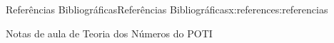 \documentclass[oneside,10pt,]{book}
\numberwithin{equation}{section}
\begin{document}
%
%
\typeout{************************************************}
\typeout{************************************************}
%
\begin{references-}{Referências Bibliográficas}{}{Referências Bibliográficas}{}{}{x:references:referencias}
\begin{referencelist}
\hypertarget{x:biblio:poti-tn-01}{}  Notas de aula de Teoria dos Números do POTI
\end{referencelist}
\end{references-}
\end{document}

